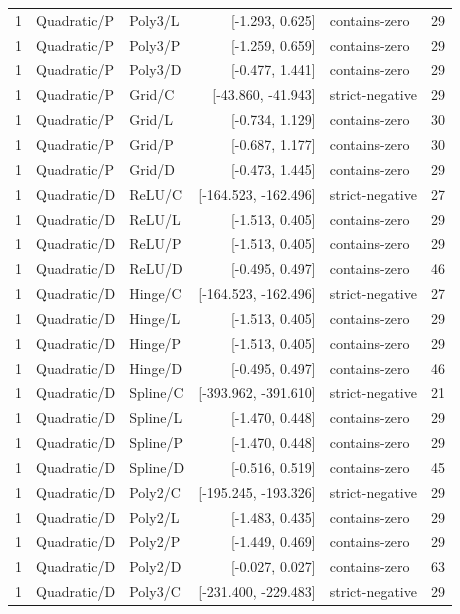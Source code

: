 \begin{longtable}{lllrlr}
1 & Quadratic/P & Poly3/L & [-1.293, 0.625] & contains-zero & 29 \\
1 & Quadratic/P & Poly3/P & [-1.259, 0.659] & contains-zero & 29 \\
1 & Quadratic/P & Poly3/D & [-0.477, 1.441] & contains-zero & 29 \\
1 & Quadratic/P & Grid/C & [-43.860, -41.943] & strict-negative & 29 \\
1 & Quadratic/P & Grid/L & [-0.734, 1.129] & contains-zero & 30 \\
1 & Quadratic/P & Grid/P & [-0.687, 1.177] & contains-zero & 30 \\
1 & Quadratic/P & Grid/D & [-0.473, 1.445] & contains-zero & 29 \\
1 & Quadratic/D & ReLU/C & [-164.523, -162.496] & strict-negative & 27 \\
1 & Quadratic/D & ReLU/L & [-1.513, 0.405] & contains-zero & 29 \\
1 & Quadratic/D & ReLU/P & [-1.513, 0.405] & contains-zero & 29 \\
1 & Quadratic/D & ReLU/D & [-0.495, 0.497] & contains-zero & 46 \\
1 & Quadratic/D & Hinge/C & [-164.523, -162.496] & strict-negative & 27 \\
1 & Quadratic/D & Hinge/L & [-1.513, 0.405] & contains-zero & 29 \\
1 & Quadratic/D & Hinge/P & [-1.513, 0.405] & contains-zero & 29 \\
1 & Quadratic/D & Hinge/D & [-0.495, 0.497] & contains-zero & 46 \\
1 & Quadratic/D & Spline/C & [-393.962, -391.610] & strict-negative & 21 \\
1 & Quadratic/D & Spline/L & [-1.470, 0.448] & contains-zero & 29 \\
1 & Quadratic/D & Spline/P & [-1.470, 0.448] & contains-zero & 29 \\
1 & Quadratic/D & Spline/D & [-0.516, 0.519] & contains-zero & 45 \\
1 & Quadratic/D & Poly2/C & [-195.245, -193.326] & strict-negative & 29 \\
1 & Quadratic/D & Poly2/L & [-1.483, 0.435] & contains-zero & 29 \\
1 & Quadratic/D & Poly2/P & [-1.449, 0.469] & contains-zero & 29 \\
1 & Quadratic/D & Poly2/D & [-0.027, 0.027] & contains-zero & 63 \\
1 & Quadratic/D & Poly3/C & [-231.400, -229.483] & strict-negative & 29 \\

\end{longtable}
